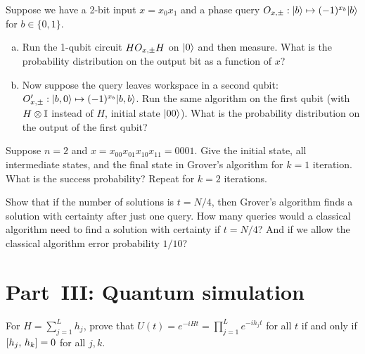 \documentclass[12pt,oneside]{amsart}
\begin{document}
\begin{exercise}\label{ex:dj-workspace}
  Suppose we have a 2-bit input $x = x_0 x_1$ and a phase query
  $O_{x,\pm}:|b\rangle \mapsto (-1)^{x_b}|b\rangle$ for $b\in \{0,1\}$.
  \begin{enumerate}[(a)]
    \item Run the 1-qubit circuit $HO_{x,\pm} H$ on $|0\rangle$ and then measure.
      What is the probability distribution on the output bit as a function
      of $x$?
    \item Now suppose the query leaves workspace in a second qubit:
      $O'_{x,\pm}:|b,0\rangle\mapsto (-1)^{x_b}|b,b\rangle$.
      Run the same algorithm on the first qubit (with $H\otimes \mathbb{I}$ instead of
      $H$, initial state $|00\rangle$).  What is the probability distribution
      on the output of the first qubit?
  \end{enumerate}
\end{exercise}

\begin{exercise}\label{ex:grover-explicit}
  Suppose $n = 2$ and $x = x_{00}x_{01}x_{10}x_{11} = 0001$.  Give the
  initial state, all intermediate states, and the final state in Grover's
  algorithm for $k = 1$ iteration.  What is the success probability?
  Repeat for $k = 2$ iterations.
\end{exercise}

\begin{exercise}[Grover with $t = N/4$]\label{ex:grover-quarter}
  Show that if the number of solutions is $t = N/4$, then Grover's algorithm
  finds a solution with certainty after just one query.  How many queries
  would a classical algorithm need to find a solution with certainty if
  $t = N/4$?  And if we allow the classical algorithm error probability
  $1/10$?
\end{exercise}

\section*{Part~III: Quantum simulation}
\setcounter{section}{3}
\setcounter{exercise}{0}

\begin{exercise}\label{ex:commuting-ham}
  For $H = \sum_{j=1}^L h_j$, prove that
  $U(t) = e^{-iHt} = \prod_{j=1}^L e^{-ih_jt}$ for all $t$ if and only if
  $[h_j,\,h_k]= 0$ for all $j,k$.
\end{exercise}
\end{document}
